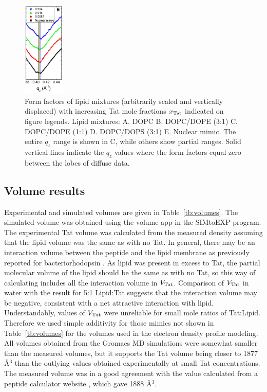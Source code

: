 \begin{figure}[htbp]
  \includegraphics[width=0.175\textwidth]{figures/Tat/figure3e}
  \caption{Form factors of lipid mixtures (arbitrarily scaled and vertically displaced) with
  increasing Tat mole fractions $x_\textrm{Tat}$ indicated on figure legends. Lipid mixtures: A. DOPC
  B. DOPC/DOPE (3:1) C. DOPC/DOPE (1:1) D. DOPC/DOPS (3:1) E. Nuclear mimic. The
  entire $q_z$ range is shown in C, while others show partial ranges. Solid vertical lines indicate the
  $q_z$ values where the form factors equal zero between the lobes of diffuse data.}
  \label{fig:figure3}
\end{figure}

\subsection{Volume results}\label{sec:volume_results}
Experimental and simulated volumes are given in Table~\ref{tb:volumes}. The simulated volume was
obtained using the volume app in the SIMtoEXP program. The experimental Tat volume was
calculated from the measured density assuming that the lipid volume was the same as with no
Tat. In general, there may be an interaction volume between the peptide and the lipid membrane
as previously reported for bacteriorhodopsin \cite{Tristram-Nagle86}. As lipid was present in excess to Tat, the
partial molecular volume of the lipid should be the same as with no Tat, so this way of
calculating includes all the interaction volume in $V_\textrm{Tat}$. Comparison of $V_\textrm{Tat}$ in water with the
result for 5:1 Lipid:Tat suggests that the interaction volume may be negative, consistent with a
net attractive interaction with lipid. Understandably, values of $V_\textrm{Tat}$ were unreliable for small
mole ratios of Tat:Lipid. Therefore we used simple additivity for those mimics not shown in
Table~\ref{tb:volumes} for the volumes used in the electron density profile modeling. 
All volumes obtained from the Gromacs MD
simulations were somewhat smaller than the measured volumes, but it supports the Tat volume
being closer to 1877 \AA$^3$ than the outlying values obtained experimentally at small Tat
concentrations. The measured volume was in a good agreement with the 
value calculated from a peptide calculator website \cite{peptide_calc}, which
gave 1888 \AA$^3$. 

